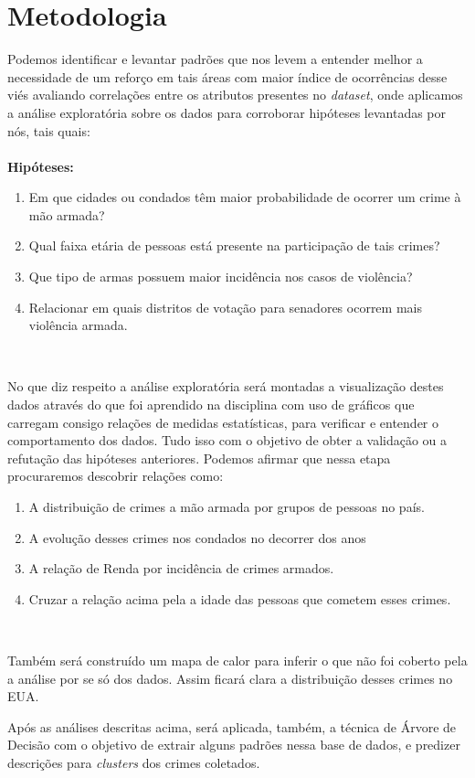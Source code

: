 \section{
Metodologia} 
\par
Podemos identificar e levantar padrões que nos levem a entender melhor a necessidade de um reforço em tais áreas com maior índice de ocorrências desse viés avaliando correlações entre os atributos presentes no \textit{dataset}, onde aplicamos a análise exploratória sobre os dados para corroborar hipóteses levantadas por nós, tais quais:
\\
\\

\textbf{Hipóteses:}

\begin{enumerate}
\item Em que cidades ou condados têm maior probabilidade de ocorrer um crime à mão armada?
\item Qual faixa etária de pessoas está presente na participação de tais crimes?
\item Que tipo de armas possuem maior incidência nos casos de violência?
\item Relacionar em quais  distritos de votação para senadores ocorrem mais violência armada.
\end{enumerate}
\\

\par
No que diz respeito a análise exploratória será montadas a visualização destes dados  através do que foi aprendido na disciplina com uso de gráficos que carregam consigo relações de medidas estatísticas, para verificar e entender o comportamento dos dados.  Tudo isso com o objetivo de obter a validação ou a refutação das hipóteses anteriores. Podemos afirmar que nessa etapa procuraremos descobrir relações como:
\\
\begin{enumerate}
\item A distribuição de crimes a mão armada por grupos de pessoas no país.
\item A evolução desses crimes nos condados no decorrer dos anos 
\item A relação de Renda por incidência de crimes armados.
\item Cruzar a relação acima pela a idade das pessoas que cometem esses crimes.
\end{enumerate}
\\
\par
Também será construído um mapa de calor para inferir o que não foi coberto pela a análise por se só dos dados. Assim ficará clara a distribuição desses crimes no EUA.    
\par
Após as análises descritas acima, será aplicada, também, a técnica de Árvore de Decisão com o objetivo de extrair alguns padrões nessa base de dados, e predizer descrições para \textit{clusters} dos crimes coletados.
